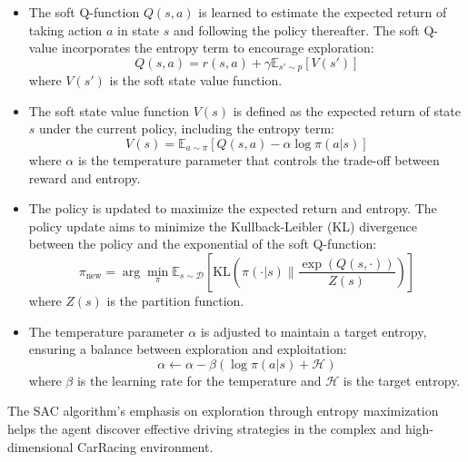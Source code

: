 \documentclass[../CSC_52081_EP.tex]{subfiles}
\begin{document}
\begin{itemize}
    \item The soft Q-function \( Q(s, a) \) is learned to estimate the expected return of taking action \( a \) in state \( s \) and following the policy thereafter. The soft Q-value incorporates the entropy term to encourage exploration:
    \[
    Q(s, a) = r(s, a) + \gamma \mathbb{E}_{s' \sim p} \left[ V(s') \right]
    \]
    where \( V(s') \) is the soft state value function.

    \item The soft state value function \( V(s) \) is defined as the expected return of state \( s \) under the current policy, including the entropy term:
    \[
    V(s) = \mathbb{E}_{a \sim \pi} \left[ Q(s, a) - \alpha \log \pi(a|s) \right]
    \]
    where \( \alpha \) is the temperature parameter that controls the trade-off between reward and entropy.

    \item The policy is updated to maximize the expected return and entropy. The policy update aims to minimize the Kullback-Leibler (KL) divergence between the policy and the exponential of the soft Q-function:
    \[
    \pi_{\text{new}} = \arg \min_{\pi} \mathbb{E}_{s \sim \mathcal{D}} \left[ \text{KL} \left( \pi(\cdot|s) \| \frac{\exp(Q(s, \cdot))}{Z(s)} \right) \right]
    \]
    where \( Z(s) \) is the partition function.

    \item The temperature parameter \( \alpha \) is adjusted to maintain a target entropy, ensuring a balance between exploration and exploitation:
    \[
    \alpha \leftarrow \alpha - \beta \left( \log \pi(a|s) + \mathcal{H} \right)
    \]
    where \( \beta \) is the learning rate for the temperature and \( \mathcal{H} \) is the target entropy.
\end{itemize}

The SAC algorithm's emphasis on exploration through entropy maximization helps the agent discover effective driving strategies in the complex and high-dimensional CarRacing environment.
\end{document}
